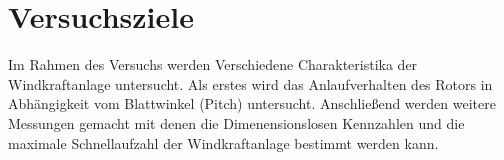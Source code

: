 \section{Versuchsziele}
Im Rahmen des Versuchs werden Verschiedene Charakteristika der Windkraftanlage untersucht. Als erstes wird das Anlaufverhalten des Rotors in Abhängigkeit vom Blattwinkel (Pitch) untersucht. Anschließend werden weitere Messungen gemacht mit denen die Dimenensionslosen Kennzahlen und die maximale Schnellaufzahl der Windkraftanlage bestimmt werden kann.
